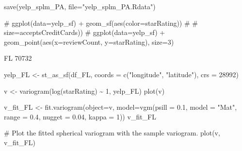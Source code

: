 \documentclass[
  12pt,
  letterpaper,
  DIV=11,
  numbers=noendperiod]{scrartcl}
\newenvironment{Shaded}{\begin{snugshade}}{\end{snugshade}}
\newcommand{\AttributeTok}[1]{\textcolor[rgb]{0.98,0.46,0.51}{#1}}
\newcommand{\CommentTok}[1]{\textcolor[rgb]{0.42,0.45,0.49}{#1}}
\newcommand{\DecValTok}[1]{\textcolor[rgb]{0.47,0.72,1.00}{#1}}
\newcommand{\FloatTok}[1]{\textcolor[rgb]{0.47,0.72,1.00}{#1}}
\newcommand{\FunctionTok}[1]{\textcolor[rgb]{0.70,0.57,0.94}{#1}}
\newcommand{\NormalTok}[1]{\textcolor[rgb]{0.88,0.89,0.91}{#1}}
\newcommand{\OtherTok}[1]{\textcolor[rgb]{0.70,0.57,0.94}{#1}}
\newcommand{\SpecialCharTok}[1]{\textcolor[rgb]{0.47,0.72,1.00}{#1}}
\newcommand{\StringTok}[1]{\textcolor[rgb]{0.62,0.80,1.00}{#1}}
\begin{document}
\begin{Shaded}
\begin{Highlighting}[]
\FunctionTok{save}\NormalTok{(yelp\_splm\_PA, }\AttributeTok{file=}\StringTok{"yelp\_splm\_PA.Rdata"}\NormalTok{)}
\end{Highlighting}
\end{Shaded}

\begin{Shaded}
\begin{Highlighting}[]
\CommentTok{\# ggplot(data=yelp\_sf) + geom\_sf(aes(color=starRating))}
\CommentTok{\#                                \# size=acceptsCreditCards))}
\CommentTok{\# ggplot(data=yelp\_sf) + geom\_point(aes(x=reviewCount, y=starRating), size=3)}
\end{Highlighting}
\end{Shaded}

FL 70732

\begin{Shaded}
\begin{Highlighting}[]
\NormalTok{yelp\_FL }\OtherTok{\textless{}{-}} \FunctionTok{st\_as\_sf}\NormalTok{(df\_FL, }\AttributeTok{coords =} \FunctionTok{c}\NormalTok{(}\StringTok{"longitude"}\NormalTok{, }\StringTok{"latitude"}\NormalTok{), }\AttributeTok{crs =} \DecValTok{28992}\NormalTok{)}
\end{Highlighting}
\end{Shaded}

\begin{Shaded}
\begin{Highlighting}[]
\NormalTok{v }\OtherTok{\textless{}{-}} \FunctionTok{variogram}\NormalTok{(}\FunctionTok{log}\NormalTok{(starRating) }\SpecialCharTok{\textasciitilde{}} \DecValTok{1}\NormalTok{, yelp\_FL)}
\FunctionTok{plot}\NormalTok{(v)}
\end{Highlighting}
\end{Shaded}

\begin{Shaded}
\begin{Highlighting}[]
\NormalTok{v\_fit\_FL }\OtherTok{\textless{}{-}} \FunctionTok{fit.variogram}\NormalTok{(}\AttributeTok{object=}\NormalTok{v, }
                           \AttributeTok{model=}\FunctionTok{vgm}\NormalTok{(}\AttributeTok{psill =} \FloatTok{0.1}\NormalTok{, }\AttributeTok{model =} \StringTok{"Mat"}\NormalTok{, }
                                     \AttributeTok{range =} \FloatTok{0.4}\NormalTok{, }\AttributeTok{nugget =} \FloatTok{0.04}\NormalTok{, }\AttributeTok{kappa =} \DecValTok{1}\NormalTok{))}
\NormalTok{v\_fit\_FL}

\CommentTok{\# Plot the fitted spherical variogram with the sample variogram.}
\FunctionTok{plot}\NormalTok{(v, v\_fit\_FL)}
\end{Highlighting}
\end{Shaded}
\end{document}
